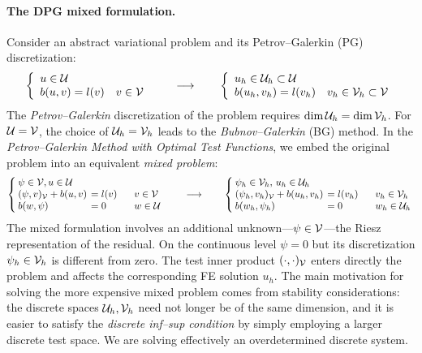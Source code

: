 \paragraph{The DPG mixed formulation.} Consider an abstract variational problem and its Petrov--Galerkin (PG) discretization:
\[
\left\{
\begin{array}{lllll}
u \in \mathcal{U} \\
b(u,v) = l(v) \quad v \in \mathcal{V}
\end{array}
\right.
\qquad
\longrightarrow
\qquad
\left\{
\begin{array}{lllll}
u_h \in \mathcal{U}_h \subset \mathcal{U} \\
b(u_h,v_h) = l(v_h) \quad v_h \in \mathcal{V}_h \subset \mathcal{V}
\end{array}
\right.
\]
The {\em Petrov--Galerkin } discretization of the problem requires $\dim \mathcal{U}_h = \dim \mathcal{V}_h$. For $\mathcal{U}=\mathcal{V}$, the choice of $\mathcal{U}_h=\mathcal{V}_h$ leads to the {\em Bubnov--Galerkin} (BG) method.
In the {\em Petrov--Galerkin Method with Optimal Test Functions}, we embed the original problem into an equivalent {\em mixed problem}:
\[
\arraycolsep=2pt
\left\{
\begin{array}{lllll}
\psi \in \test, u \in \trial \\
(\psi,v)_\test + b(u,v) & = l(v)  \quad &\ v \in \test\\
b(w,\psi) & = 0 &\ w \in \trial
\end{array}
\right.
\qquad
\longrightarrow
\qquad
\left\{
\begin{array}{lllll}
\psi_h \in \test_h ,\, u_h \in \trial_h \\
(\psi_h,v_h)_\test + b(u_h,v_h) & = l(v_h) \quad &\ v_h \in \test_h \\
b(w_h, \psi_h) & = 0 &\ w_h \in \trial_h
\end{array}
\right.
\]
The mixed formulation involves an additional unknown---$\psi \in \mathcal{V}$---the Riesz representation of the residual. On the continuous level $\psi = 0$ but its discretization $\psi_h \in \mathcal{V}_h$ is different from zero. The test inner product $(\cdot,\cdot)_{\mathcal{V}}$ enters directly the problem and affects the corresponding FE solution $u_h$. The main motivation for solving the more expensive mixed problem comes from stability considerations: the discrete spaces $\mathcal{U}_h,\mathcal{V}_h$ need not longer be of the same dimension, and it is easier to satisfy the \emph{discrete inf--sup condition} by simply employing a larger discrete test space. We are solving effectively an overdetermined discrete system.

